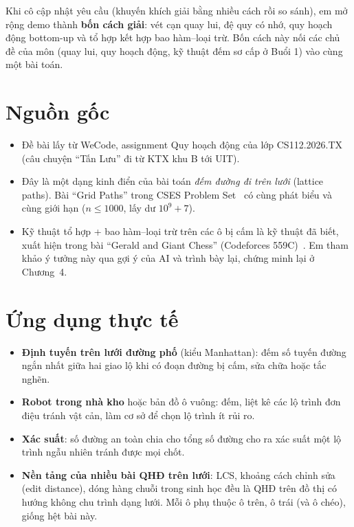 \documentclass[12pt,a4paper]{report}
\begin{document}
Khi cô cập nhật yêu cầu (khuyến khích giải bằng nhiều cách rồi so sánh), em mở rộng demo thành \textbf{bốn cách giải}: vét cạn quay lui, đệ quy có nhớ, quy hoạch động bottom-up và tổ hợp kết hợp bao hàm--loại trừ. Bốn cách này nối các chủ đề của môn (quay lui, quy hoạch động, kỹ thuật đếm sơ cấp ở Buổi 1) vào cùng một bài toán.

\section{Nguồn gốc}
\begin{itemize}
  \item Đề bài lấy từ WeCode, assignment Quy hoạch động của lớp CS112.2026.TX (câu chuyện ``Tấn Lưu'' đi từ KTX khu B tới UIT).
  \item Đây là một dạng kinh điển của bài toán \emph{đếm đường đi trên lưới} (lattice paths). Bài ``Grid Paths'' trong CSES Problem Set~\cite{cses} có cùng phát biểu và cùng giới hạn ($n \le 1000$, lấy dư $10^9+7$).
  \item Kỹ thuật tổ hợp + bao hàm--loại trừ trên các ô bị cấm là kỹ thuật đã biết, xuất hiện trong bài ``Gerald and Giant Chess'' (Codeforces 559C)~\cite{cf559c}. Em tham khảo ý tưởng này qua gợi ý của AI và trình bày lại, chứng minh lại ở Chương~4.
\end{itemize}

\section{Ứng dụng thực tế}
\begin{itemize}
  \item \textbf{Định tuyến trên lưới đường phố} (kiểu Manhattan): đếm số tuyến đường ngắn nhất giữa hai giao lộ khi có đoạn đường bị cấm, sửa chữa hoặc tắc nghẽn.
  \item \textbf{Robot trong nhà kho} hoặc bản đồ ô vuông: đếm, liệt kê các lộ trình đơn điệu tránh vật cản, làm cơ sở để chọn lộ trình ít rủi ro.
  \item \textbf{Xác suất}: số đường an toàn chia cho tổng số đường cho ra xác suất một lộ trình ngẫu nhiên tránh được mọi chốt.
  \item \textbf{Nền tảng của nhiều bài QHĐ trên lưới}: LCS, khoảng cách chỉnh sửa (edit distance), dóng hàng chuỗi trong sinh học đều là QHĐ trên đồ thị có hướng không chu trình dạng lưới. Mỗi ô phụ thuộc ô trên, ô trái (và ô chéo), giống hệt bài này.
\end{itemize}
\end{document}
